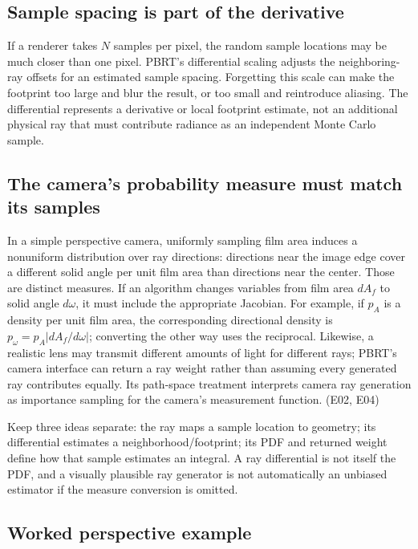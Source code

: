 \subsection{Sample spacing is part of the derivative}\label{02-foundations-ii-ch036-sample-spacing-is-part-of-the-derivative}

If a renderer takes \(N\) samples per pixel, the random sample locations may be much closer than one pixel. PBRT's differential scaling adjusts the neighboring-ray offsets for an estimated sample spacing. Forgetting this scale can make the footprint too large and blur the result, or too small and reintroduce aliasing. The differential represents a derivative or local footprint estimate, not an additional physical ray that must contribute radiance as an independent Monte Carlo sample.

\subsection{The camera's probability measure must match its samples}\label{02-foundations-ii-ch036-the-cameras-probability-measure-must-match-its-samples}

In a simple perspective camera, uniformly sampling film area induces a nonuniform distribution over ray directions: directions near the image edge cover a different solid angle per unit film area than directions near the center. Those are distinct measures. If an algorithm changes variables from film area \(dA_f\) to solid angle \(d\omega\), it must include the appropriate Jacobian. For example, if \(p_A\) is a density per unit film area, the corresponding directional density is \(p_\omega=p_A\left|dA_f/d\omega\right|\); converting the other way uses the reciprocal. Likewise, a realistic lens may transmit different amounts of light for different rays; PBRT's camera interface can return a ray weight rather than assuming every generated ray contributes equally. Its path-space treatment interprets camera ray generation as importance sampling for the camera's measurement function. (E02, E04)

Keep three ideas separate: the ray maps a sample location to geometry; its differential estimates a neighborhood/footprint; its PDF and returned weight define how that sample estimates an integral. A ray differential is not itself the PDF, and a visually plausible ray generator is not automatically an unbiased estimator if the measure conversion is omitted.

\subsection{Worked perspective example}\label{02-foundations-ii-ch036-worked-perspective-example}

